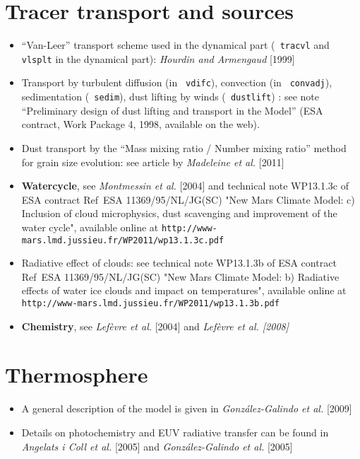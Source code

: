 \section{Tracer transport and sources} 
\begin{itemize}
\item ``Van-Leer'' transport scheme used in the dynamical part
(\verb+ tracvl+ and  \verb+ vlsplt+ in the dynamical part):
{\it Hourdin and Armengaud} [1999] \nocite{Hour:99}

\item Transport by turbulent diffusion  (in \verb+ vdifc+), convection
(in  \verb+ convadj+), sedimentation  (\verb+ sedim+),
dust lifting by winds (\verb+ dustlift+) :
see note ``Preliminary design of dust lifting and transport in the Model''
(ESA contract, Work Package 4, 1998, available on the web). 

\item Dust transport by the ``Mass mixing ratio /
Number mixing ratio'' method for grain size evolution: see article by {\it
Madeleine et al.} [2011]
\nocite{Made:11}

\item {\bf Watercycle}, see {\it Montmessin et al.} [2004]
and technical note
WP13.1.3c of ESA contract
Ref~ESA 11369/95/NL/JG(SC) "New Mars Climate Model: c) Inclusion of cloud
microphysics, dust scavenging and improvement of the water cycle",
available online at
\verb+http://www-mars.lmd.jussieu.fr/WP2011/wp13.1.3c.pdf+
\nocite{Mont:04jgr}

\item Radiative effect of clouds: see technical note
WP13.1.3b of ESA contract Ref~ESA 11369/95/NL/JG(SC)
"New Mars Climate Model: b) Radiative effects of water
ice clouds and impact on temperatures", available online at
\verb+http://www-mars.lmd.jussieu.fr/WP2011/wp13.1.3b.pdf+

\item {\bf Chemistry}, see {\it Lef\`evre et al.} [2004]
and {\it Lef\`evre et al. [2008]}
\nocite{Lefe:04,Lefe:08}
\end{itemize}

\section{Thermosphere}
\begin{itemize}
\item A general description of the model is given in
{\it Gonz{\'a}lez-Galindo et al.} [2009]
\item Details on photochemistry and EUV radiative transfer can be found in
{\it Angelats i Coll et al.} [2005] and
{\it Gonz{\'a}lez-Galindo et al.} [2005]
\end{itemize}
\nocite{Gonz:09a,Gonz:09b,Gonz:05,Ange:05}
